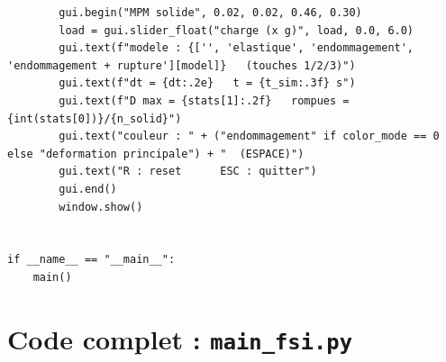 \documentclass[11pt,a4paper]{article}
\begin{document}
\begin{lstlisting}
        gui.begin("MPM solide", 0.02, 0.02, 0.46, 0.30)
        load = gui.slider_float("charge (x g)", load, 0.0, 6.0)
        gui.text(f"modele : {['', 'elastique', 'endommagement', 'endommagement + rupture'][model]}   (touches 1/2/3)")
        gui.text(f"dt = {dt:.2e}   t = {t_sim:.3f} s")
        gui.text(f"D max = {stats[1]:.2f}   rompues = {int(stats[0])}/{n_solid}")
        gui.text("couleur : " + ("endommagement" if color_mode == 0 else "deformation principale") + "  (ESPACE)")
        gui.text("R : reset      ESC : quitter")
        gui.end()
        window.show()


if __name__ == "__main__":
    main()
\end{lstlisting}

\section{Code complet : \texttt{main\_fsi.py}}
\label{app:fsi}
\end{document}
